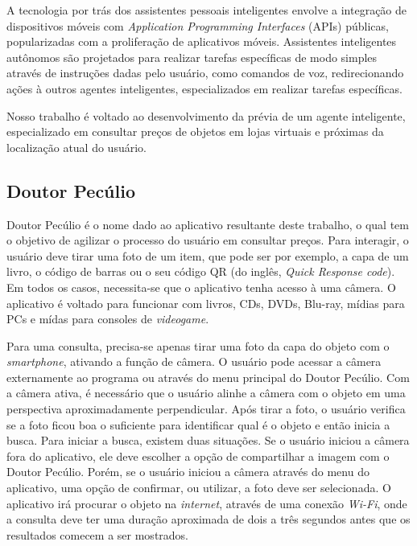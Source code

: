 A tecnologia por trás dos assistentes pessoais inteligentes envolve a integração
de dispositivos móveis com \textit{Application Programming Interfaces} (APIs)
públicas,
popularizadas com a proliferação de aplicativos móveis.  
Assistentes inteligentes autônomos são projetados para realizar tarefas
específicas de modo simples através de instruções dadas pelo usuário,
como comandos de voz, redirecionando ações à outros agentes inteligentes,
especializados em realizar tarefas específicas.

Nosso trabalho é voltado ao desenvolvimento da prévia de um agente 
inteligente, especializado em consultar preços de objetos em lojas virtuais
e próximas da localização atual do usuário.

\subsection{Doutor Pecúlio}

Doutor Pecúlio é o nome dado ao aplicativo resultante deste trabalho, o qual
tem o objetivo de agilizar o processo do usuário em consultar preços.
Para interagir, o usuário deve tirar uma foto de um item, que pode ser
por exemplo, a capa de um livro, o código de barras ou o seu código
QR (do inglês, \textit{Quick Response code}).  Em todos os casos, 
necessita-se que o aplicativo
tenha acesso à uma câmera.   O aplicativo é voltado para funcionar com
livros, CDs, DVDs, Blu-ray, mídias para PCs e mídas para consoles de 
\textit{videogame}.

Para uma consulta, precisa-se apenas tirar uma foto da capa do objeto com o 
\textit{smartphone}, ativando a função de câmera.  O usuário pode acessar a
câmera externamente ao programa ou através do menu principal do Doutor Pecúlio.
Com a câmera ativa, é necessário que o usuário alinhe a câmera com o objeto
em uma perspectiva aproximadamente perpendicular.  Após tirar a foto, o 
usuário verifica se a foto ficou boa o suficiente para identificar qual é o
objeto e então inicia a busca.   Para iniciar a busca, existem duas situações.
Se o usuário iniciou a câmera fora do aplicativo, ele deve escolher a opção
de compartilhar a imagem com o Doutor Pecúlio. Porém, se o usuário iniciou
a câmera através do menu do aplicativo, uma opção de confirmar, ou utilizar, a
foto deve ser selecionada.  O aplicativo irá procurar o objeto na 
\textit{internet}, através de uma conexão \textit{Wi-Fi}, onde a consulta
deve ter uma duração aproximada de dois a três segundos antes que os 
resultados comecem a ser mostrados.

